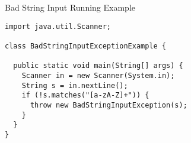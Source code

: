 \begin{cl}[]{Bad String Input Running Example}
\begin{lstlisting}[language=MyJava]
import java.util.Scanner;

class BadStringInputExceptionExample {
  
  public static void main(String[] args) {
    Scanner in = new Scanner(System.in);
    String s = in.nextLine();
    if (!s.matches("[a-zA-Z]+")) { 
      throw new BadStringInputException(s); 
    }
  }
}
\end{lstlisting}
\end{cl}


